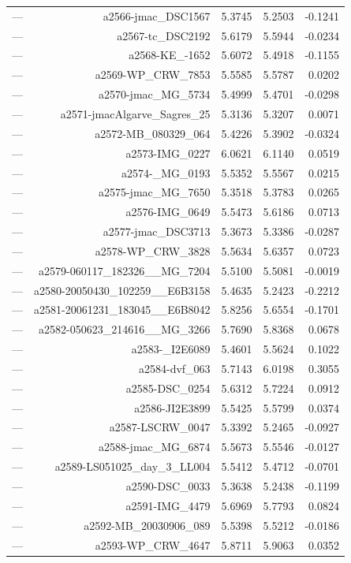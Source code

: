 \begin{table}[htbp]
\begin{tabular}{lrrrr}
— & a2566-jmac_DSC1567 & 5.3745 & 5.2503 & -0.1241 \\
— & a2567-tc_DSC2192 & 5.6179 & 5.5944 & -0.0234 \\
— & a2568-KE_-1652 & 5.6072 & 5.4918 & -0.1155 \\
— & a2569-WP_CRW_7853 & 5.5585 & 5.5787 & 0.0202 \\
— & a2570-jmac_MG_5734 & 5.4999 & 5.4701 & -0.0298 \\
— & a2571-jmacAlgarve_Sagres_25 & 5.3136 & 5.3207 & 0.0071 \\
— & a2572-MB_080329_064 & 5.4226 & 5.3902 & -0.0324 \\
— & a2573-IMG_0227 & 6.0621 & 6.1140 & 0.0519 \\
— & a2574-_MG_0193 & 5.5352 & 5.5567 & 0.0215 \\
— & a2575-jmac_MG_7650 & 5.3518 & 5.3783 & 0.0265 \\
— & a2576-IMG_0649 & 5.5473 & 5.6186 & 0.0713 \\
— & a2577-jmac_DSC3713 & 5.3673 & 5.3386 & -0.0287 \\
— & a2578-WP_CRW_3828 & 5.5634 & 5.6357 & 0.0723 \\
— & a2579-060117_182326__MG_7204 & 5.5100 & 5.5081 & -0.0019 \\
— & a2580-20050430_102259__E6B3158 & 5.4635 & 5.2423 & -0.2212 \\
— & a2581-20061231_183045__E6B8042 & 5.8256 & 5.6554 & -0.1701 \\
— & a2582-050623_214616__MG_3266 & 5.7690 & 5.8368 & 0.0678 \\
— & a2583-_I2E6089 & 5.4601 & 5.5624 & 0.1022 \\
— & a2584-dvf_063 & 5.7143 & 6.0198 & 0.3055 \\
— & a2585-DSC_0254 & 5.6312 & 5.7224 & 0.0912 \\
— & a2586-JI2E3899 & 5.5425 & 5.5799 & 0.0374 \\
— & a2587-LSCRW_0047 & 5.3392 & 5.2465 & -0.0927 \\
— & a2588-jmac_MG_6874 & 5.5673 & 5.5546 & -0.0127 \\
— & a2589-LS051025_day_3_LL004 & 5.5412 & 5.4712 & -0.0701 \\
— & a2590-DSC_0033 & 5.3638 & 5.2438 & -0.1199 \\
— & a2591-IMG_4479 & 5.6969 & 5.7793 & 0.0824 \\
— & a2592-MB_20030906_089 & 5.5398 & 5.5212 & -0.0186 \\
— & a2593-WP_CRW_4647 & 5.8711 & 5.9063 & 0.0352 \\

\end{tabular}
\end{table}
